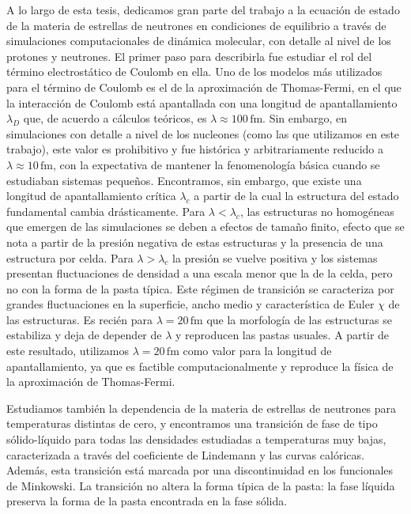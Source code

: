 
A lo largo de esta tesis, dedicamos gran parte del trabajo a la ecuación de estado de la materia de estrellas de neutrones en condiciones de equilibrio a través de simulaciones computacionales de dinámica molecular, con detalle al nivel de los protones y neutrones.
El primer paso para describirla fue estudiar el rol del término electrostático de Coulomb en ella.
Uno de los modelos más utilizados para el término de Coulomb es el de la aproximación de Thomas-Fermi, en el que la interacción de Coulomb está apantallada con una longitud de apantallamiento $\lambda_D$ que, de acuerdo a cálculos teóricos, es $\lambda\approx100\,\text{fm}$.
Sin embargo, en simulaciones con detalle a nivel de los nucleones (como las que utilizamos en este trabajo), este valor es prohibitivo y fue histórica y arbitrariamente reducido a $\lambda\approx10\,\text{fm}$, con la expectativa de mantener la fenomenología básica cuando se estudiaban sistemas pequeños.
Encontramos, sin embargo, que existe una longitud de apantallamiento crítica $\lambda_c$ a partir de la cual la estructura del estado fundamental cambia drásticamente.
Para $\lambda<\lambda_c$, las estructuras no homogéneas que emergen de las simulaciones se deben a efectos de tamaño finito, efecto que se nota a partir de la presión negativa de estas estructuras y la presencia de una estructura por celda.
Para $\lambda>\lambda_c$ la presión se vuelve positiva y los sistemas presentan fluctuaciones de densidad a una escala menor que la de la celda, pero no con la forma de la pasta típica.
Este régimen de transición se caracteriza por grandes fluctuaciones en la superficie, ancho medio y característica de Euler $\chi$ de las estructuras.
Es recién para $\lambda=20\,\text{fm}$ que la morfología de las estructuras se estabiliza y deja de depender de $\lambda$ y reproducen las pastas usuales.
A partir de este resultado, utilizamos $\lambda=20\,\text{fm}$ como valor para la longitud de apantallamiento, ya que es factible computacionalmente y reproduce la física de la aproximación de Thomas-Fermi.


Estudiamos también la dependencia de la materia de estrellas de neutrones para temperaturas distintas de cero, y encontramos una transición de fase de tipo sólido-líquido para todas las densidades estudiadas a temperaturas muy bajas, caracterizada a través del coeficiente de Lindemann y las curvas calóricas.
Además, esta transición está marcada por una discontinuidad en los funcionales de Minkowski.
La transición no altera la forma típica de la pasta: la fase líquida preserva la forma de la pasta encontrada en la fase sólida.

